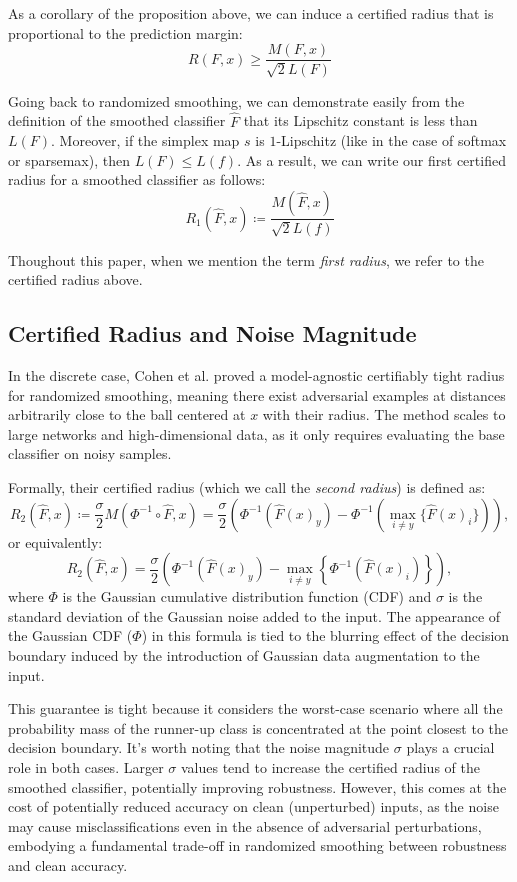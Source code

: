 As a corollary of the proposition above, we can induce a certified radius that is proportional to the prediction margin:
\[
    R(F,x) \geq \frac{M(F,x)}{\sqrt{2}L(F)}
\]

Going back to randomized smoothing, we can demonstrate easily from the definition of the smoothed classifier $\hat{F}$ that its Lipschitz constant is less than $L(F)$.
Moreover, if the simplex map $s$ is $1$-Lipschitz (like in the case of softmax or sparsemax), then $L(F)\leq L(f)$.
As a result, we can write our first certified radius for a smoothed classifier as follows:
\begin{equation}
    R_1(\hat{F},x) \coloneqq \frac{M(\hat{F},x)}{\sqrt{2}L(f)}\label{eq:first-radius}
\end{equation}

Thoughout this paper, when we mention the term \textit{first radius}, we refer to the certified radius above.

\subsection{Certified Radius and Noise Magnitude}\label{subsec:certified-radius-and-noise-magnitude}
In the discrete case, Cohen et al.
proved a model-agnostic certifiably tight radius for randomized smoothing, meaning there exist adversarial examples at distances arbitrarily close to the ball centered at $x$ with their radius.
The method scales to large networks and high-dimensional data, as it only requires evaluating the base classifier on noisy samples.

Formally, their certified radius (which we call the \textit{second radius}) is defined as:
\begin{equation}
    R_2(\hat{F},x) \coloneqq \frac{\sigma}{2}M(\Phi^{-1}\circ\hat{F},x)=\frac{\sigma}{2}\left(\Phi^{-1}(\hat{F}(x)_{y})-\Phi^{-1}(\max_{i \neq y}\{ \hat{F}(x)_i \})\right),\label{eq:second-radius}
\end{equation}
or equivalently:
\[
    R_2(\hat{F},x) =\frac{\sigma}{2}\left(\Phi^{-1}(\hat{F}(x)_{y})-\max_{i \neq y}\left\{  \Phi^{-1}( \hat{F}(x)_i)\right\}\right),
\]
where $\Phi$ is the Gaussian cumulative distribution function (CDF) and $\sigma$ is the standard deviation of the Gaussian noise added to the input.
The appearance of the Gaussian CDF ($\Phi$) in this formula is tied to the blurring effect of the decision boundary induced by the introduction of Gaussian data augmentation to the input.

This guarantee is tight because it considers the worst-case scenario where all the probability mass of the runner-up class is concentrated at the point closest to the decision boundary.
It's worth noting that the noise magnitude $\sigma$ plays a crucial role in both cases.
Larger $\sigma$ values tend to increase the certified radius of the smoothed classifier, potentially improving robustness.
However, this comes at the cost of potentially reduced accuracy on clean (unperturbed) inputs, as the noise may cause misclassifications even in the absence of adversarial perturbations, embodying a fundamental trade-off in randomized smoothing between robustness and clean accuracy.